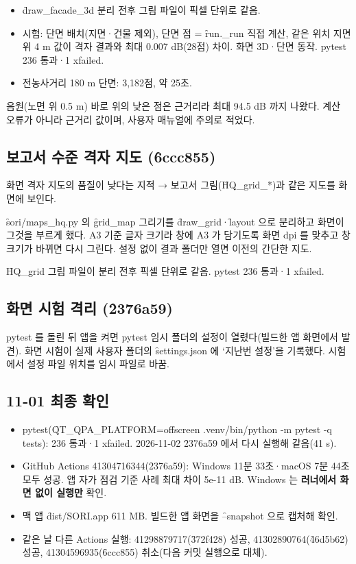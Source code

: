 \documentclass[10.5pt,a4paper]{article}
\begin{document}
\begin{itemize}
\item \f{draw\_facade\_3d} 분리 전후 그림 파일이 픽셀 단위로 같음.
\item 시험: 단면 배치(지면·건물 제외), 단면 점 = \f{run.\_run} 직접 계산, 같은 위치 지면 위 4 m 값이 격자 결과와 최대 0.007 dB(28점) 차이. 화면 3D·단면 동작. pytest 236 통과·1 xfailed.
\item 전농사거리 180 m 단면: 3,182점, 약 25초.
\end{itemize}

 음원(노면 위 0.5 m) 바로 위의 낮은 점은 근거리라 최대 94.5 dB 까지 나왔다. 계산 오류가 아니라 근거리 값이며, 사용자 매뉴얼에 주의로 적었다.

\subsection{보고서 수준 격자 지도 (\f{6ccc855})}
 화면 격자 지도의 품질이 낮다는 지적 → 보고서 그림(\f{HQ\_grid\_*})과 같은 지도를 화면에 보인다.

 \f{sori/maps\_hq.py} 의 \f{grid\_map} 그리기를 \f{draw\_grid}·\f{layout} 으로 분리하고 화면이 그것을 부르게 했다. A3 기준 글자 크기라 창에 A3 가 담기도록 화면 dpi 를 맞추고 창 크기가 바뀌면 다시 그린다. 설정 없이 결과 폴더만 열면 이전의 간단한 지도.

 \f{HQ\_grid} 그림 파일이 분리 전후 픽셀 단위로 같음. pytest 236 통과·1 xfailed.

\subsection{화면 시험 격리 (\f{2376a59})}
 pytest 를 돌린 뒤 앱을 켜면 pytest 임시 폴더의 설정이 열렸다(빌드한 앱 화면에서 발견).
 화면 시험이 실제 사용자 폴더의 \f{settings.json} 에 ‘지난번 설정’을 기록했다.
 시험에서 설정 파일 위치를 임시 파일로 바꿈.

\subsection{11-01 최종 확인}
\begin{itemize}
\item pytest(\f{QT\_QPA\_PLATFORM=offscreen .venv/bin/python -m pytest -q tests}): 236 통과·1 xfailed. 2026-11-02 \f{2376a59} 에서 다시 실행해 같음(41 s).
\item GitHub Actions 41304716344(\f{2376a59}): Windows 11분 33초·macOS 7분 44초 모두 성공. 앱 자가 점검 기준 사례 최대 차이 5e-11 dB. Windows 는 \textbf{러너에서 화면 없이 실행만} 확인.
\item 맥 앱 \f{dist/SORI.app} 611 MB. 빌드한 앱 화면을 \f{--snapshot} 으로 캡처해 확인.
\item 같은 날 다른 Actions 실행: 41298879717(\f{372f428}) 성공, 41302890764(\f{46d5b62}) 성공, 41304596935(\f{6ccc855}) 취소(다음 커밋 실행으로 대체).
\end{itemize}
\end{document}

